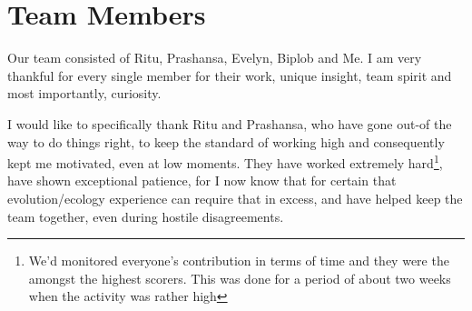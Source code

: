 \section*{Team Members}
	Our team consisted of Ritu, Prashansa, Evelyn, Biplob and Me. I am very thankful for every single member for their work, unique insight, team spirit and most importantly, curiosity.
	\par
	I would like to specifically thank Ritu and Prashansa, who have gone out-of the way to do things right, to keep the standard of working high and consequently kept me motivated, even at low moments. They have worked extremely hard\footnote{We'd monitored everyone's contribution in terms of time and they were the amongst the highest scorers. This was done for a period of about two weeks when the activity was rather high}, have shown exceptional patience, for I now know that for certain that evolution/ecology experience can require that in excess, and have helped keep the team together, even during hostile disagreements.
\bigskip


\endgroup



